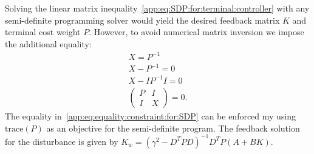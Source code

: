 %
Solving the linear matrix inequality~\eqref{app:eq:SDP:for:terminal:controller} with any semi-definite programming solver would yield the desired feedback matrix $K$ and terminal cost weight $P$. 
%
However, to avoid numerical matrix inversion we impose the additional equality:
%
\begin{equation}\label{app:eq:equality:constraint:for:SDP}\begin{split}
	X = P^{-1}\\
	X - P^{-1} = 0 \\
	X - IP^{-1}I = 0 \\
	\left(\begin{array}{cc}
	P & I \\ I & X
	\end{array}\right) = 0.
\end{split}\end{equation}
%
The equality in~\eqref{app:eq:equality:constraint:for:SDP} can be enforced my using $\text{trace}(P)$ as an objective for the semi-definite program.
%
The feedback solution for the disturbance is given by $K_w = (\gamma^2-D^T P D)^{-1}D^T P (A+BK)$.